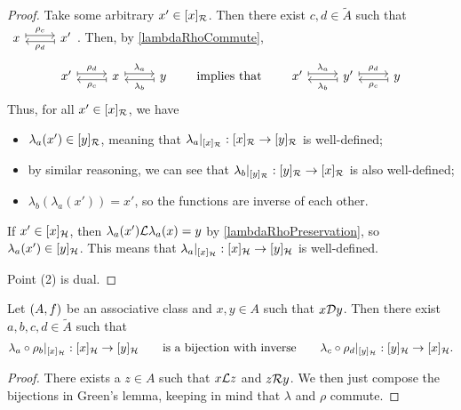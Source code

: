 \begin{proof}
Take some arbitrary $x'\in [x]_{\mathcal{R}}$. Then there exist $c,d\in \widetilde{A}$ such that $\begin{tikzcd}
x \ar[r, maps to, shift left, "\rho_c"] & x' \ar[l, maps to, shift left, "\rho_d"]
\end{tikzcd}$. Then, by \ref{lambdaRhoCommute},
\[ \begin{tikzcd}
x' \ar[r, maps to, shift left, "\rho_d"] & x \ar[l, maps to, shift left, "\rho_c"] \ar[r, maps to, shift left, "\lambda_a"] & y \ar[l, maps to, shift left, "\lambda_b"]
\end{tikzcd} \qquad\text{implies that} \qquad \begin{tikzcd}
x' \ar[r, maps to, shift left, "\lambda_a"] & y' \ar[l, maps to, shift left, "\lambda_b"] \ar[r, maps to, shift left, "\rho_d"] & y \ar[l, maps to, shift left, "\rho_c"]
\end{tikzcd} \]
Thus, for all $x'\in [x]_{\mathcal{R}}$, we have
\begin{itemize}
\item $\lambda_a(x') \in [y]_{\mathcal{R}}$, meaning that $\lambda_a|_{[x]_{\mathcal{R}}}: [x]_{\mathcal{R}} \to [y]_{\mathcal{R}}$ is well-defined;
\item by similar reasoning, we can see that $\lambda_b|_{[y]_{\mathcal{R}}}: [y]_{\mathcal{R}} \to [x]_{\mathcal{R}}$ is also well-defined;
\item $\lambda_b(\lambda_a(x')) = x'$, so the functions are inverse of each other.
\end{itemize}
If $x'\in [x]_{\mathcal{H}}$, then $\lambda_a(x')\mathcal{L} \lambda_a(x) = y$ by \ref{lambdaRhoPreservation}, so $\lambda_a(x')\in [y]_{\mathcal{H}}$. This means that $\lambda_a|_{[x]_{\mathcal{H}}}: [x]_{\mathcal{H}} \to [y]_{\mathcal{H}}$ is well-defined.

Point (2) is dual.
\end{proof}
\begin{corollary} \label{greensDisomorphism}
Let $\left( A, f \right)$ be an associative class and $x, y\in A$ such that $x\mathcal{D} y$. Then there exist $a,b,c,d\in \widetilde{A}$ such that
\[ \lambda_a\circ\rho_b|_{[x]_{\mathcal{H}}}: [x]_{\mathcal{H}} \to [y]_{\mathcal{H}} \qquad \text{is a bijection with inverse} \qquad \lambda_c\circ \rho_d|_{[y]_{\mathcal{H}}}: [y]_{\mathcal{H}} \to [x]_{\mathcal{H}}. \]
\end{corollary}
\begin{proof}
There exists a $z\in A$ such that $x\mathcal{L} z$ and $z\mathcal{R} y$. We then just compose the bijections in Green's lemma, keeping in mind that $\lambda$ and $\rho$ commute.
\end{proof}
